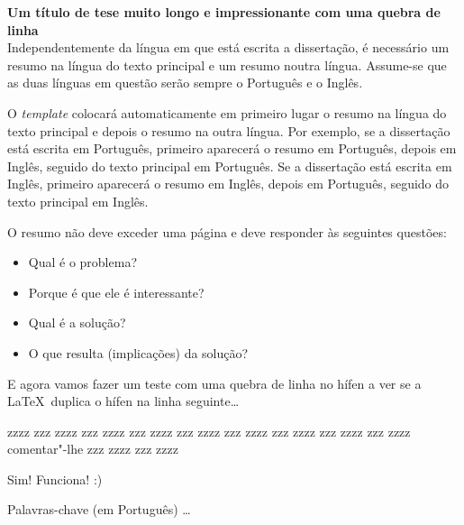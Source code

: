  {\large \textbf{Um título de tese muito longo e impressionante com uma
 quebra de linha}}\\[1ex]
\noindent Independentemente da língua em que está escrita a dissertação, é necessário um resumo na língua do texto principal e um resumo noutra língua.  Assume-se que as duas línguas em questão serão sempre o Português e o Inglês.

O \emph{template} colocará automaticamente em primeiro lugar o resumo na língua do texto principal e depois o resumo na outra língua.  Por exemplo, se a dissertação está escrita em Português, primeiro aparecerá o resumo em Português, depois em Inglês, seguido do texto principal em Português. Se a dissertação está escrita em Inglês, primeiro aparecerá o resumo em Inglês, depois em Português, seguido do texto principal em Inglês.

O resumo não deve exceder uma página e deve responder às seguintes questões:
\begin{itemize}
	\item Qual é o problema?
	\item Porque é que ele é interessante?
	\item Qual é a solução?
	\item O que resulta (implicações) da solução?
\end{itemize}

E agora vamos fazer um teste com uma quebra de linha no hífen a ver se a \LaTeX\ duplica o hífen na linha seguinte…

zzzz zzz zzzz zzz zzzz zzz zzzz zzz zzzz zzz zzzz zzz zzzz zzz zzzz zzz zzzz comentar"-lhe zzz zzzz zzz zzzz 

Sim!  Funciona! :)

\begin{keywords}
Palavras-chave (em Português) \ldots
\end{keywords}
